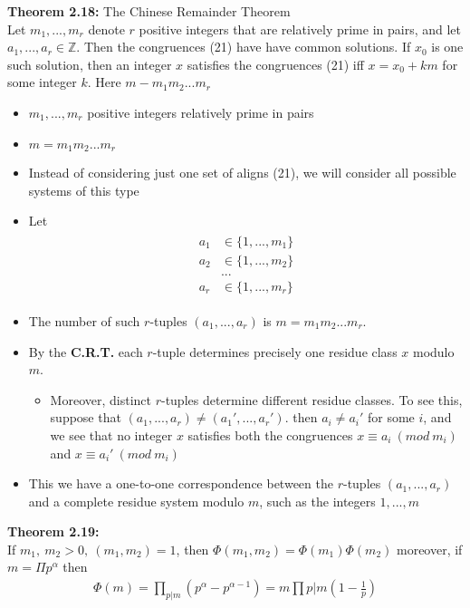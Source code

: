 \documentclass[a4paper]{article}
\begin{document}
\textbf{Theorem 2.18:} The Chinese Remainder Theorem\\
Let $m_1,...,m_r$ denote $r$ positive integers that are relatively prime in pairs, and let $a_1,...,a_r\in\mathbb{Z}$. Then the congruences (21) have have common solutions. If $x_0$ is one such solution, then an integer $x$ satisfies the congruences (21) iff $x=x_0+km$ for some integer $k$. Here $m-m_1m_2...m_r$


\begin{itemize}
    \item $m_1,...,m_r$ positive integers relatively prime in pairs
    \item $m=m_1m_2...m_r$
    \item Instead of considering just one set of aligns (21), we will consider all possible systems of this type
    \item Let
    \begin{align}
        \begin{split}
            a_1&\in\{1,...,m_1\}\\
            a_2&\in\{1,...,m_2\}\\
            &...\\
            a_r&\in\{1,...,m_r\}
        \end{split}
    \end{align}
    \item The number of such $r$-tuples $(a_1,...,a_r)$ is $m=m_1m_2...m_r$.
    \item By the \textbf{C.R.T.} each $r$-tuple determines precisely one residue class $x$ modulo $m$.
    \begin{itemize}
        \item Moreover, distinct $r$-tuples determine different residue classes. To see this, suppose that $(a_1,...,a_r)\neq(a_1',...,a_r')$. then $a_i\neq a_i'$ for some $i$, and we see that no integer $x$ satisfies both the congruences $x\equiv a_i\ (mod\ m_i)$ and $x\equiv a_i'\ (mod\ m_i)$
    \end{itemize}
    \item This we have a one-to-one correspondence between the $r$-tuples $(a_1,...,a_r)$ and a complete residue system modulo $m$, such as the integers $1,...,m$
\end{itemize}

\textbf{Theorem 2.19:}\\
If $m_1,\ m_2>0,\ (m_1,m_2)=1$, then $\Phi(m_1,m_2)=\Phi(m_1)\Phi(m_2)$ moreover, if $m=\Pi p^\alpha$ then
\begin{align}
    \Phi(m)=\prod_{p|m}(p^\alpha-p^{\alpha-1})=m\prod{p|m}(1-\frac{1}{p})
\end{align}
\end{document}
